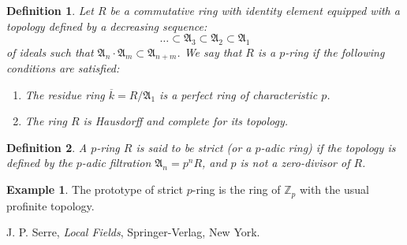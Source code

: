 \documentclass[12pt]{article}
\newtheorem{defn}{Definition}
\theoremstyle{definition}
\newtheorem{exa}{Example}
\newcommand{\Ints}{\mathbb{Z}}
\newcommand{\mA}{\mathfrak{A}}
\begin{document}
\begin{defn}
Let $R$ be a commutative ring with identity element equipped with a topology defined by a decreasing sequence:
$$\ldots \subset \mA_3 \subset \mA_2 \subset \mA_1$$
of ideals such that $\mA_n\cdot \mA_m \subset \mA_{n+m}$. We say that $R$ is a $p$-ring if the following conditions are satisfied:
\begin{enumerate}
\item The residue ring $\overline{k}=R/\mA_1$ is a perfect ring of characteristic $p$.

\item The ring $R$ is Hausdorff and complete for its topology.
\end{enumerate}
\end{defn}

\begin{defn}
A $p$-ring $R$ is said to be strict (or a $p$-adic ring) if the topology is defined by the $p$-adic filtration $\mA_n=p^nR$, and $p$ is not a zero-divisor of $R$.
\end{defn}

\begin{exa}
The prototype of strict $p$-ring is the ring of  $\Ints_p$ with the usual profinite topology.
\end{exa}

\begin{thebibliography}{9}
 J. P. Serre, {\em Local Fields},
Springer-Verlag, New York.
\end{thebibliography}
\end{document}
